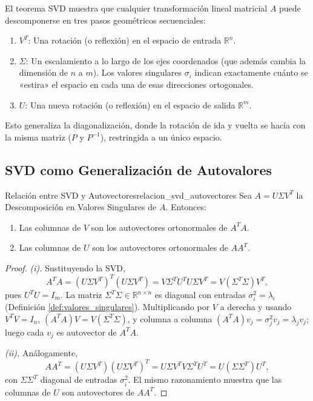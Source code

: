 \documentclass[11pt, a4paper]{article}
\begin{document}
El teorema SVD muestra que cualquier transformación lineal matricial $A$ puede descomponerse en tres pasos geométricos secuenciales:
\begin{enumerate}
    \item $V^T$: Una rotación (o reflexión) en el espacio de entrada $\mathbb{R}^n$.
    \item $\Sigma$: Un escalamiento a lo largo de los ejes coordenados (que además cambia la dimensión de $n$ a $m$). Los valores singulares $\sigma_i$ indican exactamente cuánto se «estira» el espacio en cada una de esas direcciones ortogonales.
    \item $U$: Una nueva rotación (o reflexión) en el espacio de salida $\mathbb{R}^m$.
\end{enumerate}
Esto generaliza la diagonalización, donde la rotación de ida y vuelta se hacía con la misma matriz ($P$ y $P^{-1}$), restringida a un único espacio.

\subsection{SVD como Generalización de Autovalores}

\begin{proposicion}{Relación entre SVD y Autovectores}{relacion_svd_autovectores}
Sea $A = U \Sigma V^T$ la Descomposición en Valores Singulares de $A$. Entonces:
\begin{enumerate}
    \item[i)] Las columnas de $V$ son los autovectores ortonormales de $A^T A$.
    \item[ii)] Las columnas de $U$ son los autovectores ortonormales de $A A^T$.
\end{enumerate}
\end{proposicion}

\begin{proof}
\textit{(i).} Sustituyendo la SVD,
\[ A^T A = (U \Sigma V^T)^T (U \Sigma V^T) = V \Sigma^T U^T U \Sigma V^T = V (\Sigma^T \Sigma) V^T, \]
pues $U^T U = I_m$. La matriz $\Sigma^T \Sigma \in \mathbb{R}^{n \times n}$ es diagonal con entradas $\sigma_i^2 = \lambda_i$ (Definición \ref{def:valores_singulares}). Multiplicando por $V$ a derecha y usando $V^T V = I_n$, $(A^T A) V = V (\Sigma^T \Sigma)$, y columna a columna $(A^T A) v_j = \sigma_j^2 v_j = \lambda_j v_j$; luego cada $v_j$ es autovector de $A^T A$.

\textit{(ii).} Análogamente,
\[ A A^T = (U \Sigma V^T)(U \Sigma V^T)^T = U \Sigma V^T V \Sigma^T U^T = U (\Sigma \Sigma^T) U^T, \]
con $\Sigma \Sigma^T$ diagonal de entradas $\sigma_i^2$. El mismo razonamiento muestra que las columnas de $U$ son autovectores de $A A^T$.
\end{proof}
\end{document}
